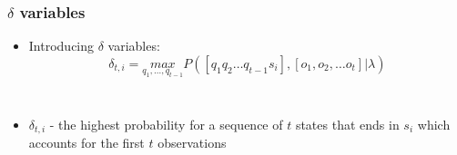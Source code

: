 \begin{frame}
  \frametitle{$\delta$ variables}
  \begin{itemize}
  \item Introducing $\delta$ variables:
    \begin{equation}
      \label{eq:delta-definition}
      \delta_{t,i}=\underset{q_1,\ldots,q_{t-1}}{max} 
      P([q_1 q_2 \ldots q_{t-1} s_i], [o_1, o_2, \ldots o_t] \vert \lambda)
    \end{equation}
  \end{itemize}
  \begin{columns}
    \begin{itemize}
    \item $\delta_{t,i}$ - the highest probability for a sequence of
      $t$ states that ends in $s_i$ which accounts for the first $t$
      observations 
    \end{itemize}
     
  \end{columns}
\end{frame}

